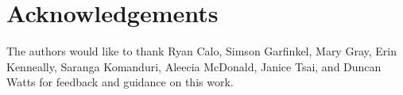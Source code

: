 \section*{Acknowledgements}
The authors would like to thank Ryan Calo, Simson Garfinkel, Mary Gray, Erin Kenneally, Saranga Komanduri, Aleecia McDonald, Janice Tsai, and Duncan Watts for feedback and guidance on this work.

